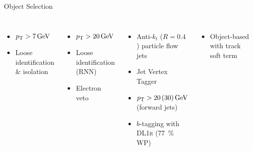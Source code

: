 \documentclass[11pt, xcolor={dvipsnames}, aspectratio=169]{beamer}
\begin{document}
\begin{frame}{Object Selection}
  \begin{columns}[onlytextwidth]

    \begin{itemize}
    \item $\pT > \SI{7}{\GeV}$
    \item Loose identification \& isolation
    \end{itemize}

    \vspace*{1em}

    \allbold{\tauhadvis:}
    \begin{itemize}
    \item $\pT > \SI{20}{\GeV}$
    \item Loose identification (RNN)
    \item Electron veto
    \end{itemize}




    \begin{itemize}
    \item Anti-$k_{t}$ ($R = 0.4$) particle flow jets
    \item Jet Vertex Tagger
    \item $\pT > \num{20} \, (\num{30})\,\si{\GeV}$ (forward jets)
    \item $b$-tagging with \textsc{DL1r} (\SI{77}{\percent} WP)
    \end{itemize}

    \vspace*{1em}

    \allbold{\pTmissAbs:}
    \begin{itemize}
    \item Object-based with track soft term
    \end{itemize}
  \end{columns}

\end{frame}
\end{document}
